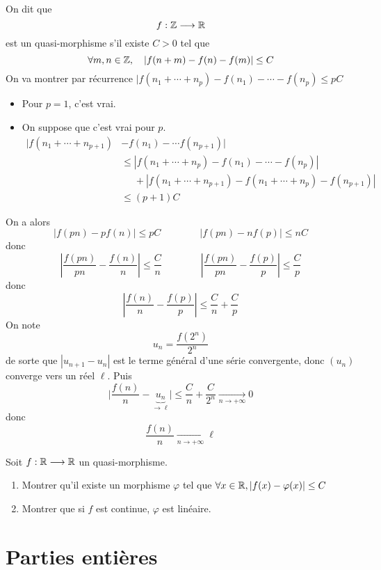 \begin{ex}
    On dit que \[
        f:\mathbb Z\longrightarrow\mathbb R
    \]
    est un quasi-morphisme s'il existe $C>0$ tel que \[
        \forall m,n\in\mathbb Z, \quad |f(n+m)-f(n)-f(m)|\leq C
    \]
    On va montrer par récurrence $|f(n_1+\cdots +n_p)-f(n_1)-\cdots -f(n_p)\leq pC$
    \begin{itemize}
        \item Pour $p=1$, c'est vrai.
        \item On suppose que c'est vrai pour $p$. \begin{align*}
                |f(n_1+\cdots +n_{p+1})&-f(n_1)-\cdots f(n_{p+1})|\\ &\leq |f(n_1+\cdots+n_{p})-f(n_1)-\cdots-f(n_p)|\\&\phantom{\leq }+|f(n_1+\cdots+n_{p+1})-f(n_1+\cdots +n_p)-f(n_{p+1})|\\&\leq (p+1)C
            \end{align*}
    \end{itemize}
    On a alors \[
        |f(pn)-pf(n)|\leq pC\qquad \qquad |f(pn)-nf(p)|\leq nC
    \]
    donc \[
        \left| \frac{f(pn)}{pn}-\frac{f(n)}n \right|\leq \frac Cn\qquad \qquad \left| \frac{f(pn)}{pn}-\frac{f(p)}p \right|\leq \frac Cp
    \]
    donc \[
        \left| \frac{f(n)}n-\frac{f(p)}p \right|\leq \frac Cn+\frac Cp
    \]
    On note \[
        u_n=\frac{f(2^n)}{2^n}
    \]
    de sorte que $|u_{n+1}-u_n|$ est le terme général d'une série convergente, donc $(u_n)$ converge vers un réel $\ell$. Puis \[
        \Big| \frac{f(n)}n-\underbrace{u_n}_{\longrightarrow \ell} \Big|\leq \frac Cn+\frac C{2^n}\xrightarrow[n\to+\infty]{}0
    \]
    donc \[
        \frac {f(n)}n\xrightarrow[n\to+\infty]{}\ell
    \]
\end{ex}

\begin{exo}
    Soit $f:\mathbb R\longrightarrow \mathbb R$ un quasi-morphisme. \begin{enumerate}
        \item Montrer qu'il existe un morphisme $\varphi$ tel que $\forall x\in\mathbb R, |f(x)-\varphi(x)|\leq C$
        \item Montrer que si $f$ est continue, $\varphi$ est linéaire.
    \end{enumerate}
\end{exo}

\section{Parties entières}

